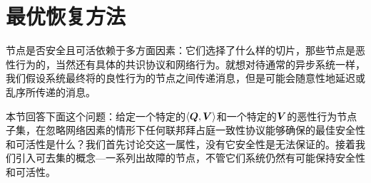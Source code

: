 \section{最优恢复方法}\label{sec:resilience}

节点是否安全且可活依赖于多方面因素：它们选择了什么样的{\quorum}切片，那些节点是恶性行为的，当然还有具体的共识协议和网络行为。就想对待通常的异步系统一样，我们假设系统最终将的良性行为的节点之间传递消息，但是可能会随意性地延迟或乱序所传递的消息。

本节回答下面这个问题：给定一个特定的$\langle{\bm Q},{\bm V}\rangle$和一个特定的${\bm V}$的恶性行为节点子集，在忽略网络因素的情形下任何联邦拜占庭一致性协议能够确保的最佳安全性和可活性是什么？我们首先讨论{\quorum}交这一属性，没有它安全性是无法保证的。接着我们引入可去集的概念---一系列出故障的节点，不管它们系统仍然有可能保持安全性和可活性。



